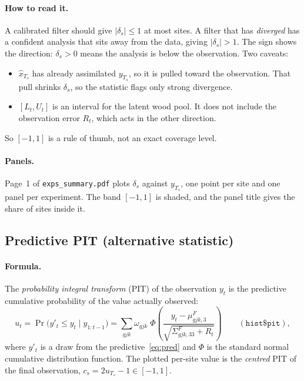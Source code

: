 \documentclass[11pt]{article}
\newcommand{\code}[1]{\texttt{#1}}
\begin{document}
\paragraph{How to read it.} A calibrated filter should give $|\delta_s| \le 1$ at most
sites. A filter that has \emph{diverged} has a confident analysis that sits away from
the data, giving $|\delta_s| > 1$. The sign shows the direction: $\delta_s > 0$ means the
analysis is below the observation. Two caveats:
\begin{itemize}
  \item $\hat x_{T_s}$ has already assimilated $y_{T_s}$, so it is pulled toward the
  observation. That pull shrinks $\delta_s$, so the statistic flags only strong
  divergence.
  \item $[L_t, U_t]$ is an interval for the latent wood pool. It does not include the
  observation error $R_t$, which acts in the other direction.
\end{itemize}
So $[-1, 1]$ is a rule of thumb, not an exact coverage level.

\paragraph{Panels.} Page~1 of \code{exps\_summary.pdf} plots $\delta_s$ against
$y_{T_s}$, one point per site and one panel per experiment. The band $[-1, 1]$ is shaded,
and the panel title gives the share of sites inside it.

\subsection{Predictive PIT (alternative statistic)}

\paragraph{Formula.} The \emph{probability integral transform} (PIT) of the observation
$y_t$ is the predictive cumulative probability of the value actually observed:
\[
  u_t = \Pr\big(y'_t \le y_t \mid y_{1:t-1}\big)
      = \sum_{gjk}\omega_{gjk}\;
        \Phi\!\left(\frac{y_t - \mu^F_{gjk,3}}{\sqrt{\Sigma^F_{gjk,33} + R_t}}\right)
  \qquad(\code{hist\$pit}),
\]
where $y'_t$ is a draw from the predictive~\eqref{eq:pred} and $\Phi$ is the standard
normal cumulative distribution function. The plotted per-site value is the
\emph{centred} PIT of the final observation, $c_s = 2u_{T_s} - 1 \in [-1, 1]$.
\end{document}

